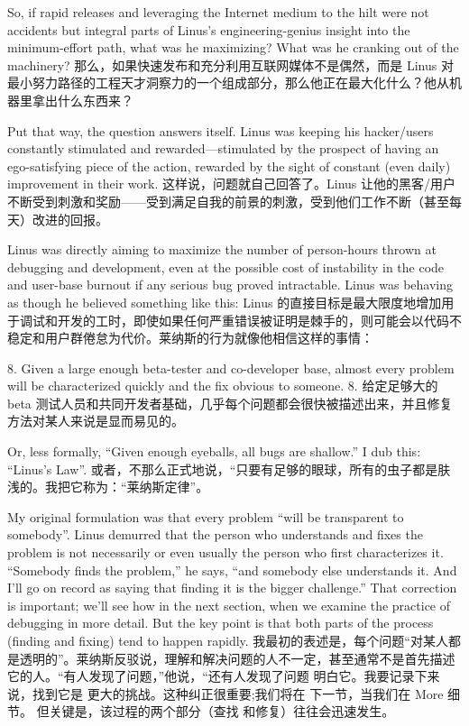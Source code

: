 \documentclass[a4paper,12pt,UTF8,twoside]{ctexbook}
\begin{document}
So, if rapid releases and leveraging the Internet medium to the hilt were not accidents but integral parts of Linus's engineering-genius insight into the minimum-effort path, what was he maximizing? What was he cranking out of the machinery?
那么，如果快速发布和充分利用互联网媒体不是偶然，而是 Linus 对最小努力路径的工程天才洞察力的一个组成部分，那么他正在最大化什么？他从机器里拿出什么东西来？

Put that way, the question answers itself. Linus was keeping his hacker/users constantly stimulated and rewarded—stimulated by the prospect of having an ego-satisfying piece of the action, rewarded by the sight of constant (even daily) improvement in their work.
这样说，问题就自己回答了。Linus 让他的黑客/用户不断受到刺激和奖励——受到满足自我的前景的刺激，受到他们工作不断（甚至每天）改进的回报。

Linus was directly aiming to maximize the number of person-hours thrown at debugging and development, even at the possible cost of instability in the code and user-base burnout if any serious bug proved intractable. Linus was behaving as though he believed something like this:
Linus 的直接目标是最大限度地增加用于调试和开发的工时，即使如果任何严重错误被证明是棘手的，则可能会以代码不稳定和用户群倦怠为代价。莱纳斯的行为就像他相信这样的事情：

8. Given a large enough beta-tester and co-developer base, almost every problem will be characterized quickly and the fix obvious to someone.
8. 给定足够大的 beta 测试人员和共同开发者基础，几乎每个问题都会很快被描述出来，并且修复方法对某人来说是显而易见的。

Or, less formally, ``Given enough eyeballs, all bugs are shallow.'' I dub this: ``Linus's Law''.
或者，不那么正式地说，“只要有足够的眼球，所有的虫子都是肤浅的。我把它称为：“莱纳斯定律”。

My original formulation was that every problem ``will be transparent to somebody''. Linus demurred that the person who understands and fixes the problem is not necessarily or even usually the person who first characterizes it. ``Somebody finds the problem,'' he says, ``and somebody else understands it. And I'll go on record as saying that finding it is the bigger challenge.'' That correction is important; we'll see how in the next section, when we examine the practice of debugging in more detail. But the key point is that both parts of the process (finding and fixing) tend to happen rapidly.
我最初的表述是，每个问题“对某人都是透明的”。莱纳斯反驳说，理解和解决问题的人不一定，甚至通常不是首先描述它的人。“有人发现了问题，”他说，“还有人发现了问题 明白它。我要记录下来说，找到它是 更大的挑战。这种纠正很重要;我们将在 下一节，当我们在 More 细节。 但关键是，该过程的两个部分（查找 和修复）往往会迅速发生。
\end{document}
